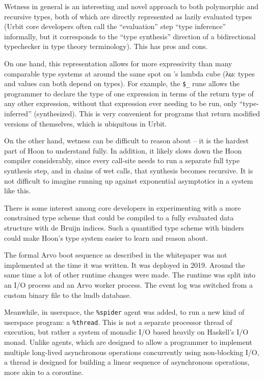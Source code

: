 \documentclass[twoside]{article}
\begin{document}
Wetness in general is an interesting and novel approach to both polymorphic and recursive types, both of which are directly represented as lazily evaluated types (Urbit core developers often call the ``evaluation'' step ``type inference'' informally, but it corresponds to the ``type synthesis'' direction of a bidirectional typechecker in type theory terminology).  This has pros and cons.

On one hand, this representation allows for more expressivity than many comparable type systems at around the same spot on \citeauthor{Barendregt1991}'s lambda cube (λω: types and values can both depend on types).  For example, the \lstinline[style=inlinecode]{$_} rune allows the programmer to declare the type of one expression in terms of the return type of any other expression, without that expression ever needing to be run, only ``type-inferred'' (synthesized).  This is very convenient for programs that return modified versions of themselves, which is ubiquitous in Urbit.

On the other hand, wetness can be difficult to reason about – it is the hardest part of Hoon to understand fully.  In addition, it likely slows down the Hoon compiler considerably, since every call-site needs to run a separate full type synthesis step, and in chains of wet calls, that synthesis becomes recursive.  It is not difficult to imagine running up against exponential asymptotics in a system like this.

There is some interest among core developers in experimenting with a more constrained type scheme that could be compiled to a fully evaluated data structure with de Bruijn indices.  Such a quantified type scheme with binders could make Hoon's type system easier to learn and reason about.

The formal Arvo boot sequence as described in the whitepaper was not implemented at the time it was written.  It was deployed in 2019.  Around the same time a lot of other runtime changes were made.  The runtime was split into an I/O process and an Arvo worker process.  The event log was switched from a custom binary file to the {\sc lmdb} database.

Meanwhile, in userspace, the \lstinline[style=inlinecode]{%spider} agent was added, to run a new kind of userspace program: a \lstinline[style=inlinecode]{%thread}.  This is not a separate processor thread of execution, but rather a system of monadic I/O based heavily on Haskell's I/O monad.  Unlike agents, which are designed to allow a programmer to implement multiple long-lived asynchronous operations concurrently using non-blocking I/O, a thread is designed for building a linear sequence of asynchronous operations, more akin to a coroutine.
\end{document}
